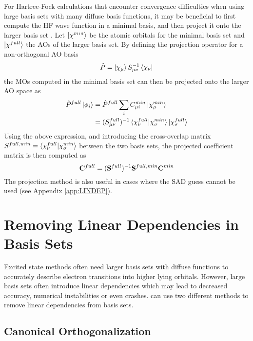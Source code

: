 For Hartree-Fock calculations that encounter convergence difficulties when using large basis sets with many diffuse basis functions, it may be beneficial to first compute the HF wave function in a minimal basis, and then project it onto the larger basis set \cite{Leh2019}. Let $\ket{\smash{\chi^{min}}}$ be the atomic orbitals for the minimal basis set and $\ket{\smash{\chi^{full}}}$ the AOs of the larger basis set. By defining the projection operator for a non-orthogonal AO basis
\begin{equation}
\hat{P} = \ket{\smash{\chi_{\mu}}} S_{\mu\nu}^{-1} \bra{\smash{\chi_{\nu}}}
\end{equation}
\noindent the MOs computed in the minimal basis set can then be projected onto the larger AO space as
\begin{equation}
\begin{split}
\hat{P}^{full}\ket{\smash{\phi_i}} &= \hat{P}^{full}\sum_i C^{min}_{\mu i} \ket{\smash{\chi^{min}_\mu}} \\
	&= (S^{full}_{\mu\nu})^{-1} \bra{\smash{\chi^{full}_{\nu}}}\ket{\smash{\chi^{min}_{\sigma}}} \ket{\smash{\chi^{full}_{\sigma}}}
\end{split} 
\end{equation}
\noindent Using the above expression, and introducing the cross-overlap matrix $S^{full,min} = \bra{\smash{\chi^{full}_{\nu}}}\ket{\smash{\chi^{min}_{\sigma}}}$ between the two basis sets, the projected coefficient matrix is then computed as
\begin{equation}
\mathbf{C}^{full} = (\mathbf{S}^{full})^{-1} \mathbf{S}^{full,min} \mathbf{C}^{min} 
\end{equation}
\noindent The projection method is also useful in cases where the SAD guess cannot be used (see Appendix \ref{app:LINDEP}). 

\chapter{Removing Linear Dependencies in Basis Sets \label{app:LINDEP}}

Excited state methods often need larger basis sets with diffuse functions to accurately describe electron transitions into higher lying orbitals. However, large basis sets often introduce linear dependencies which may lead to decreased accuracy, numerical instabilities or even crashes. \mchem{} can use two different methods to remove linear dependencies from basis sets.

\section{Canonical Orthogonalization}

